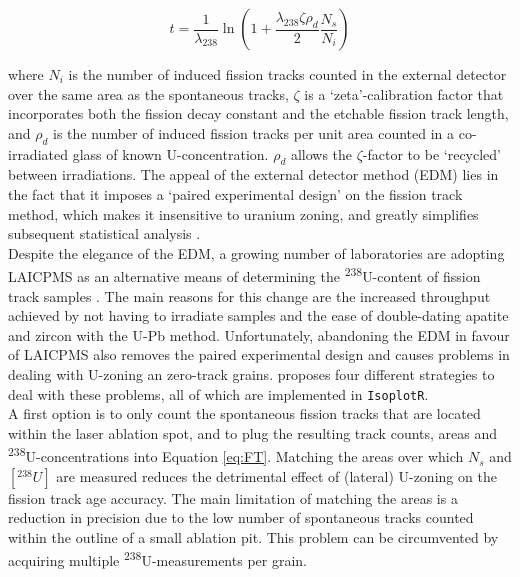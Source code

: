 \documentclass{article}
\begin{document}
\begin{equation*}
  t = \frac{1}{\lambda_{238}}
  \ln\left(
  1 + \frac{\lambda_{238}\zeta\rho_d}{2}\frac{N_s}{N_i}
  \right)
\end{equation*}

\noindent where $N_i$ is the number of induced fission tracks counted
in the external detector over the same area as the spontaneous tracks,
$\zeta$ is a `zeta'-calibration factor that incorporates both the
fission decay constant and the etchable fission track length, and
$\rho_d$ is the number of induced fission tracks per unit area counted
in a co-irradiated glass of known U-concentration. $\rho_d$ allows the
$\zeta$-factor to be `recycled' between irradiations. The appeal of
the external detector method (EDM) lies in the fact that it imposes a
`paired experimental design' on the fission track method, which makes
it insensitive to uranium zoning, and greatly simplifies subsequent
statistical analysis \citep{galbraith2010b}.\\

Despite the elegance of the EDM, a growing number of laboratories are
adopting LAICPMS as an alternative means of determining the
\textsuperscript{238}U-content of fission track samples
\citep{hasebe2004, chew2012}. The main reasons for this change are the
increased throughput achieved by not having to irradiate samples and
the ease of double-dating apatite and zircon with the U-Pb
method. Unfortunately, abandoning the EDM in favour of LAICPMS also
removes the paired experimental design and causes problems in dealing
with U-zoning an zero-track grains. \citet{vermeesch2017} proposes
four different strategies to deal with these problems, all of which
are implemented in \texttt{IsoplotR}.\\

A first option is to only count the spontaneous fission tracks that
are located within the laser ablation spot, and to plug the resulting
track counts, areas and \textsuperscript{238}U-concentrations into
Equation \ref{eq:FT}.  Matching the areas over which $N_s$ and
$[{}^{238}U]$ are measured reduces the detrimental effect of (lateral)
U-zoning on the fission track age accuracy. The main limitation of
matching the areas is a reduction in precision due to the low number
of spontaneous tracks counted within the outline of a small ablation
pit. This problem can be circumvented by acquiring multiple
\textsuperscript{238}U-measurements per grain.\\
\end{document}

